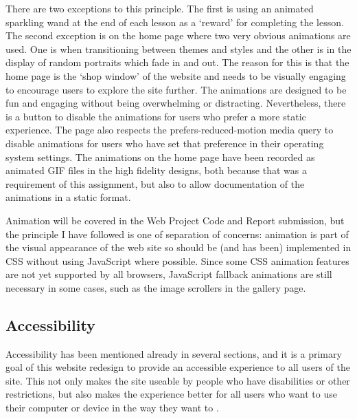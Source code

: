\documentclass[a4paper, 12pt]{article}
\begin{document}
There are two exceptions to this principle. The first is using an animated sparkling wand at the end of each lesson as a `reward' for completing the lesson. The second exception is on the home page where two very obvious animations are used. One is when transitioning between themes and styles and the other is in the display of random portraits which fade in and out. The reason for this is that the home page is the `shop window' of the website and needs to be visually engaging to encourage users to explore the site further. The animations are designed to be fun and engaging without being overwhelming or distracting. Nevertheless, there is a button to disable the animations for users who prefer a more static experience. The page also respects the prefers-reduced-motion media query to disable animations for users who have set that preference in their operating system settings. The animations on the home page have been recorded as animated GIF files in the high fidelity designs, both because that was a requirement of this assignment, but also to allow documentation of the animations in a static format.

Animation will be covered in the Web Project Code and Report submission, but the principle I have followed is one of separation of concerns: animation is part of the visual appearance of the web site so should be (and has been) implemented in CSS without using JavaScript where possible. Since some CSS animation features are not yet supported by all browsers, JavaScript fallback animations are still necessary in some cases, such as the image scrollers in the gallery page.

\subsection{Accessibility}
Accessibility has been mentioned already in several sections, and it is a primary goal of this website redesign to provide an accessible experience to all users of the site. This not only makes the site useable by people who have disabilities or other restrictions, but also makes the experience better for all users who want to use their computer or device in the way they want to \citep{story1998universal}. 
\end{document}
